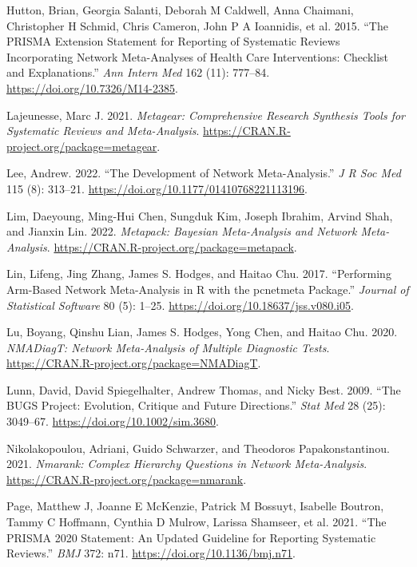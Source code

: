 \begin{CSLReferences}{1}{0}
\leavevmode{}%
Hutton, Brian, Georgia Salanti, Deborah M Caldwell, Anna Chaimani, Christopher H Schmid, Chris Cameron, John P A Ioannidis, et al. 2015. {``The PRISMA Extension Statement for Reporting of Systematic Reviews Incorporating Network Meta-Analyses of Health Care Interventions: Checklist and Explanations.''} \emph{Ann Intern Med} 162 (11): 777--84. \url{https://doi.org/10.7326/M14-2385}.

\leavevmode{}%
Lajeunesse, Marc J. 2021. \emph{Metagear: Comprehensive Research Synthesis Tools for Systematic Reviews and Meta-Analysis}. \url{https://CRAN.R-project.org/package=metagear}.

\leavevmode{}%
Lee, Andrew. 2022. {``The Development of Network Meta-Analysis.''} \emph{J R Soc Med} 115 (8): 313--21. \url{https://doi.org/10.1177/01410768221113196}.

\leavevmode{}%
Lim, Daeyoung, Ming-Hui Chen, Sungduk Kim, Joseph Ibrahim, Arvind Shah, and Jianxin Lin. 2022. \emph{Metapack: Bayesian Meta-Analysis and Network Meta-Analysis}. \url{https://CRAN.R-project.org/package=metapack}.

\leavevmode{}%
Lin, Lifeng, Jing Zhang, James S. Hodges, and Haitao Chu. 2017. {``Performing Arm-Based Network Meta-Analysis in {R} with the {pcnetmeta} Package.''} \emph{Journal of Statistical Software} 80 (5): 1--25. \url{https://doi.org/10.18637/jss.v080.i05}.

\leavevmode{}%
Lu, Boyang, Qinshu Lian, James S. Hodges, Yong Chen, and Haitao Chu. 2020. \emph{NMADiagT: Network Meta-Analysis of Multiple Diagnostic Tests}. \url{https://CRAN.R-project.org/package=NMADiagT}.

\leavevmode{}%
Lunn, David, David Spiegelhalter, Andrew Thomas, and Nicky Best. 2009. {``The BUGS Project: Evolution, Critique and Future Directions.''} \emph{Stat Med} 28 (25): 3049--67. \url{https://doi.org/10.1002/sim.3680}.

\leavevmode{}%
Nikolakopoulou, Adriani, Guido Schwarzer, and Theodoros Papakonstantinou. 2021. \emph{Nmarank: Complex Hierarchy Questions in Network Meta-Analysis}. \url{https://CRAN.R-project.org/package=nmarank}.

\leavevmode{}%
Page, Matthew J, Joanne E McKenzie, Patrick M Bossuyt, Isabelle Boutron, Tammy C Hoffmann, Cynthia D Mulrow, Larissa Shamseer, et al. 2021. {``The PRISMA 2020 Statement: An Updated Guideline for Reporting Systematic Reviews.''} \emph{BMJ} 372: n71. \url{https://doi.org/10.1136/bmj.n71}.


\end{CSLReferences}
